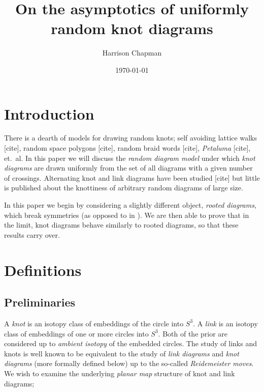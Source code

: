 \documentclass[amsmath,longbibliography,secnumarabic,floatfix,amssymb,nofootinbib,nobibnotes,letterpaper,11pt,notitlepage,tightenlines]{revtex4-1}
\begin{document}
\title[]{On the asymptotics of uniformly random knot diagrams} \author{Harrison Chapman}
 
\date{\today}

\maketitle
\section{Introduction}
\label{sec:intro}

There is a dearth of models for drawing random knots; self avoiding lattice walks [cite], random
space polygons [cite], random braid words [cite], \emph{Petaluma} [cite], et.\ al. In this paper we
will discuss the \emph{random diagram model} under which \emph{knot diagrams} are drawn uniformly
from the set of all diagrams with a given number of crossings. Alternating knot and link diagrams
have been studied [cite] but little is published about the knottiness of arbitrary random diagrams
of large size.

In this paper we begin by considering a slightly different object, \emph{rooted diagrams}, which
break symmetries (as opposed to in \cite{CCMknotdiagrams2015}). We are then able to prove that in
the limit, knot diagrams behave similarly to rooted diagrams, so that these results carry over.

\section{Definitions}
\label{sec:defns}

\subsection{Preliminaries}
\label{sec:prelimdefs}

A \emph{knot} is an isotopy class of embeddings of the circle into $S^3$. A \emph{link} is an
isotopy class of embeddings of one or more circles into $S^3$. Both of the prior are considered up
to \emph{ambient isotopy} of the embedded circles. The study of links and knots is well known to be
equivalent to the study of \emph{link diagrams} and \emph{knot diagrams} (more formally defined
below) up to the so-called \emph{Reidemeister moves}. We wish to examine the underlying \emph{planar
  map} structure of knot and link diagrams;
\end{document}
